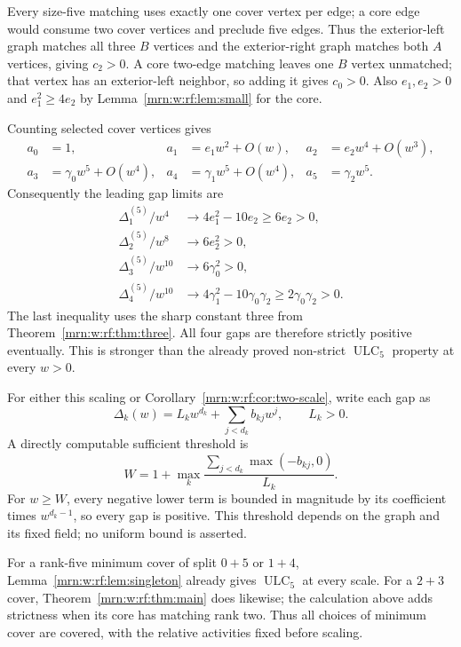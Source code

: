 \documentclass[11pt,a4paper]{article}
\theoremstyle{remark}\newtheorem{remark}[theorem]{Remark}
\newcommand{\ULC}{\operatorname{ULC}}      %
\begin{document}
Every size-five matching uses exactly one cover vertex per edge; a core edge would consume two cover vertices and preclude five edges. Thus the exterior-left graph matches all three $B$ vertices and the exterior-right graph matches both $A$ vertices, giving $c_2>0$. A core two-edge matching leaves one $B$ vertex unmatched; that vertex has an exterior-left neighbor, so adding it gives $c_0>0$. Also $e_1,e_2>0$ and $e_1^2\ge4e_2$ by Lemma~\ref{mrn:w:rf:lem:small} for the core.

Counting selected cover vertices gives
\begin{align*}
 a_0&=1,&a_1&=e_1w^2+O(w),&a_2&=e_2w^4+O(w^3),\\
 a_3&=\gamma_0w^5+O(w^4),&a_4&=\gamma_1w^5+O(w^4),&a_5&=\gamma_2w^5.
\end{align*}
Consequently the leading gap limits are
\begin{align*}
 \Delta_1^{(5)}/w^4&\longrightarrow4e_1^2-10e_2\ge6e_2>0,\\
 \Delta_2^{(5)}/w^8&\longrightarrow6e_2^2>0,\\
 \Delta_3^{(5)}/w^{10}&\longrightarrow6\gamma_0^2>0,\\
 \Delta_4^{(5)}/w^{10}&\longrightarrow4\gamma_1^2-10\gamma_0\gamma_2
 \ge2\gamma_0\gamma_2>0.
\end{align*}
The last inequality uses the sharp constant three from Theorem~\ref{mrn:w:rf:thm:three}. All four gaps are therefore strictly positive eventually. This is stronger than the already proved non-strict $\ULC_5$ property at every $w>0$.

For either this scaling or Corollary~\ref{mrn:w:rf:cor:two-scale}, write each gap as
\[
 \Delta_k(w)=L_kw^{d_k}+\sum_{j<d_k}b_{kj}w^j,\qquad L_k>0.
\]
A directly computable sufficient threshold is
\begin{equation}\label{mrn:w:rf:eq:positivethreshold}
 W=1+\max_k\frac{\sum_{j<d_k}\max(-b_{kj},0)}{L_k}.
\end{equation}
For $w\ge W$, every negative lower term is bounded in magnitude by its coefficient times $w^{d_k-1}$, so every gap is positive. This threshold depends on the graph and its fixed field; no uniform bound is asserted.

For a rank-five minimum cover of split $0+5$ or $1+4$, Lemma~\ref{mrn:w:rf:lem:singleton} already gives $\ULC_5$ at every scale. For a $2+3$ cover, Theorem~\ref{mrn:w:rf:thm:main} does likewise; the calculation above adds strictness when its core has matching rank two. Thus all choices of minimum cover are covered, with the relative activities fixed before scaling.
\end{document}
